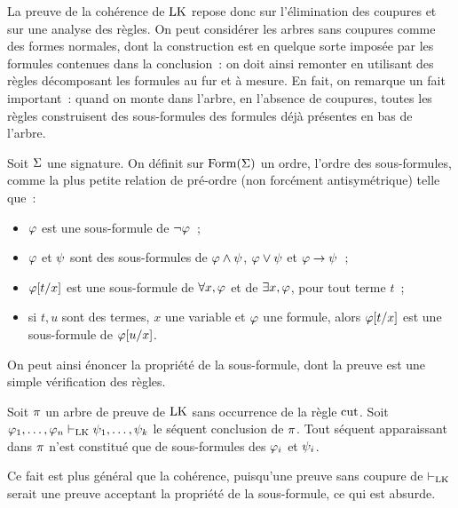 La preuve de la cohérence de $\operatorname{LK}$ repose donc sur l'élimination des coupures et
sur une analyse des règles. On peut considérer les arbres sans coupures comme
des formes normales, dont la construction est en quelque sorte imposée par les
formules contenues dans la conclusion~: on doit ainsi remonter en utilisant des
règles décomposant les formules au fur et à mesure. En fait, on remarque un fait
important~: quand on monte dans l'arbre, en l'absence de coupures, toutes les
règles construisent des sous-formules des formules déjà présentes en bas de
l'arbre.

\begin{definition}
  Soit $\Sigma$ une signature.
  On définit sur $\operatorname{Form}(\Sigma)$ un ordre, l'ordre des sous-formules, comme la
  plus petite relation de pré-ordre (non forcément antisymétrique) telle que~:
  \begin{itemize}
  \item $\varphi$ est une sous-formule de $\lnot\varphi$~;
  \item $\varphi$ et $\psi$ sont des sous-formules de $\varphi \land \psi$,
    $\varphi \lor \psi$ et $\varphi \to \psi$~;
  \item $\varphi[t/x]$ est une sous-formule de $\forall x, \varphi$ et de
    $\exists x, \varphi$, pour tout terme $t$~;
  \item si $t,u$ sont des termes, $x$ une variable et $\varphi$ une formule,
    alors $\varphi[t/x]$ est une sous-formule de $\varphi[u/x]$.
  \end{itemize}
\end{definition}

On peut ainsi énoncer la propriété de la sous-formule, dont la preuve est une
simple vérification des règles.

\begin{property}
  Soit $\pi$ un arbre de preuve de $\operatorname{LK}$ sans occurrence de la règle $\operatorname{cut}$.
  Soit $\varphi_1,\ldots,\varphi_n \vdash_{\operatorname{LK}} \psi_1,\ldots,\psi_k$ le séquent
  conclusion de $\pi$. Tout séquent apparaissant dans $\pi$ n'est
  constitué que de sous-formules des $\varphi_i$ et $\psi_i$.
\end{property}

\begin{remark}
  Ce fait est plus général que la cohérence, puisqu'une preuve sans coupure de
  $\vdash_{\operatorname{LK}}$ serait une preuve acceptant la propriété de la sous-formule, ce qui
  est absurde.
\end{remark}

